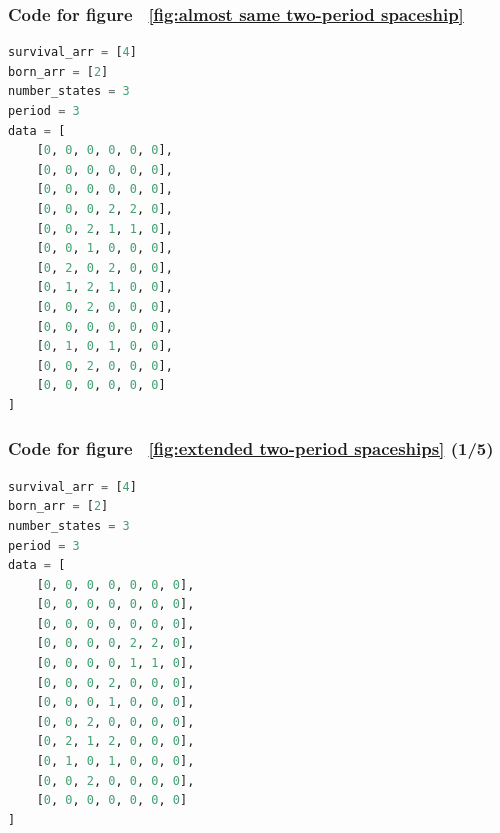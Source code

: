 \documentclass[12pt]{article}
\numberwithin{figure}{section} %
\begin{document}
\noindent\begin{minipage}{.45\textwidth}
\subsubsection{Code for figure ~\ref{fig:almost same two-period spaceship}}
\label{subsubsection:almost same two-period spaceship}
\begin{lstlisting}[language = Python]
survival_arr = [4]
born_arr = [2]
number_states = 3
period = 3
data = [
    [0, 0, 0, 0, 0, 0],
    [0, 0, 0, 0, 0, 0],
    [0, 0, 0, 0, 0, 0],
    [0, 0, 0, 2, 2, 0],
    [0, 0, 2, 1, 1, 0],
    [0, 0, 1, 0, 0, 0],
    [0, 2, 0, 2, 0, 0],
    [0, 1, 2, 1, 0, 0],
    [0, 0, 2, 0, 0, 0],
    [0, 0, 0, 0, 0, 0],
    [0, 1, 0, 1, 0, 0],
    [0, 0, 2, 0, 0, 0],
    [0, 0, 0, 0, 0, 0]
]
\end{lstlisting}
\end{minipage}\hfill
\begin{minipage}{.45\textwidth}
\subsubsection{Code for figure ~\ref{fig:extended two-period spaceships} (1/5)}
\label{subsubsection:extended two-period spaceships(1/5)}
\begin{lstlisting}[language = Python]
survival_arr = [4]
born_arr = [2]
number_states = 3
period = 3
data = [
    [0, 0, 0, 0, 0, 0, 0],
    [0, 0, 0, 0, 0, 0, 0],
    [0, 0, 0, 0, 0, 0, 0],
    [0, 0, 0, 0, 2, 2, 0],
    [0, 0, 0, 0, 1, 1, 0],
    [0, 0, 0, 2, 0, 0, 0],
    [0, 0, 0, 1, 0, 0, 0],
    [0, 0, 2, 0, 0, 0, 0],
    [0, 2, 1, 2, 0, 0, 0],
    [0, 1, 0, 1, 0, 0, 0],
    [0, 0, 2, 0, 0, 0, 0],
    [0, 0, 0, 0, 0, 0, 0]
]

\end{lstlisting}
\end{minipage}
\end{document}
